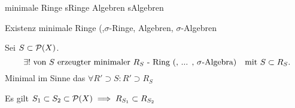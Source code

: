 \documentclass[class=article, crop=false]{standalone}
\begin{document}
\begin{zettel}{minimale Ringe sRinge Algebren sAlgebren}
\begin{flashcard}{Existenz minimale Ringe (,$\sigma$-Ringe, Algebren, $\sigma$-Algebren}
	\begin{theorem}
		Sei $S \subset \mathcal{P}(X)$.
		\[
			\exists! \tx{von $S$ erzeugter minimaler $R_S$ - Ring (, ... , $\sigma$-Algebra) } \tx{mit} S \subset  R_S
		.\]
		Minimal im Sinne das $\forall R' \supset S : R' \supset R_S$
	\end{theorem}

	\begin{corollary}
		Es gilt $S_1 \subset  S_2 \subset  \mathcal{P}(X) \implies R_{S_1} \subset R_{S_2}$
	\end{corollary}
\end{flashcard}

\end{zettel}
\end{document}
